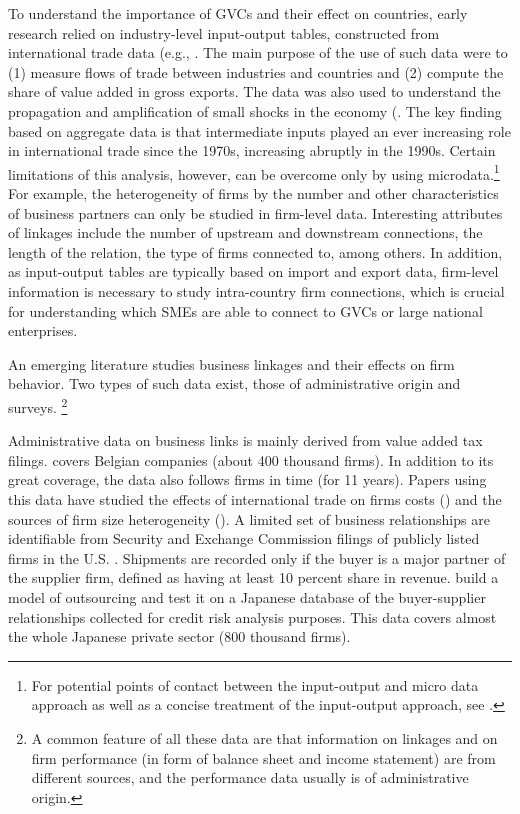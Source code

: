 \documentclass[final, dvipsnames, authoryear,12pt]{elsarticle}
\begin{document}
To understand the importance of GVCs and their effect on countries, early research relied on industry-level input-output tables, constructed from international trade data (e.g., \cite{johnson2012accounting, hummels2001nature}. The main purpose of the use of such data were to (1) measure flows of trade between industries and countries and (2) compute the share of value added in gross exports. The data was also used to understand the propagation and amplification of small shocks in the economy (\cite{acemoglu2016networks}. The key finding based on aggregate data is that intermediate inputs played an ever increasing role in international trade since the 1970s, increasing abruptly in the 1990s. Certain limitations of this analysis, however, can be overcome only by using microdata.\footnote{For potential points of contact between the input-output and micro data approach as well as a concise treatment of the input-output approach, see \cite{johnson2018measuring}.} For example, the heterogeneity of firms by the number and other characteristics of business partners can only be studied in firm-level data. Interesting attributes of linkages include the number of upstream and downstream connections, the length of the relation, the type of firms connected to, among others. In addition, as input-output tables are typically based on import and export data, firm-level information is necessary to study intra-country firm connections, which is crucial for understanding which SMEs are able to connect to GVCs or large national enterprises.

An emerging literature studies business linkages and their effects on firm behavior. Two types of such data exist, those of administrative origin and surveys. \footnote{A common feature of all these data are that information on linkages and on firm performance (in form of balance sheet and income statement) are from different sources, and the performance data usually is of administrative origin.} 

Administrative data on business links is mainly derived from value added tax filings. \cite{dhyne2015belgian} covers Belgian companies (about 400 thousand firms). In addition to its great coverage, the data also follows firms in time (for 11 years). Papers using this data have studied the effects of international trade on firms costs (\cite{tintelnot2018trade}) and the sources of firm size heterogeneity (\cite{bernard2019production}). A limited set of business relationships are identifiable from Security and Exchange Commission filings of publicly listed firms in the U.S. \cite{Barrot2016-wc}. Shipments are recorded only if the buyer is a major partner of the supplier firm, defined as having at least 10 percent share in revenue. \cite{bernard2019production} build a model of outsourcing and test it on a Japanese database of the buyer-supplier relationships collected for credit risk analysis purposes. This data covers almost the whole Japanese private sector (800 thousand firms). 
\end{document}
